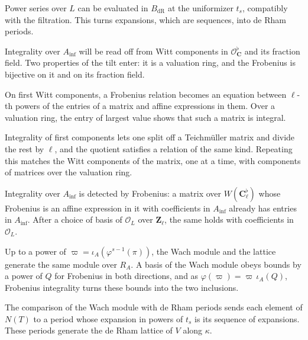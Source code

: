 Power series over $L$ can be evaluated in $B_{\mathrm{dR}}$ at the uniformizer
$t_s$, compatibly with the filtration. This turns expansions, which are
sequences, into de Rham periods.

Integrality over $A_{\mathrm{inf}}$ will be read off from Witt components in
$\mathcal O_{\mathbf C}^\flat$ and its fraction field. Two properties of the
tilt enter: it is a valuation ring, and the Frobenius is bijective on it and on
its fraction field.

On first Witt components, a Frobenius relation becomes an equation between
$\ell$-th powers of the entries of a matrix and affine expressions in them. Over
a valuation ring, the entry of largest value shows that such a matrix is
integral.

Integrality of first components lets one split off a Teichmüller matrix and
divide the rest by $\ell$, and the quotient satisfies a relation of the same
kind. Repeating this matches the Witt components of the matrix, one at a time,
with components of matrices over the valuation ring.

Integrality over $A_{\mathrm{inf}}$ is detected by Frobenius: a matrix over
$W(\mathbf C_\ell^\flat)$ whose Frobenius is an affine expression in it with
coefficients in $A_{\mathrm{inf}}$ already has entries in $A_{\mathrm{inf}}$.
After a choice of basis of $\mathcal O_L$ over $\mathbf Z_\ell$, the same holds
with coefficients in $\mathcal O_L$.

Up to a power of $\varpi=\iota_A(\varphi^{s-1}(\pi))$, the Wach module and the
lattice generate the same module over $R_A$. A basis of the Wach module obeys
bounds by a power of $Q$ for Frobenius in both directions, and as
$\varphi(\varpi)=\varpi\,\iota_A(Q)$, Frobenius integrality turns these bounds
into the two inclusions.

The comparison of the Wach module with de Rham periods sends each element of
$N(T)$ to a period whose expansion in powers of $t_s$ is its sequence of
expansions. These periods generate the de Rham lattice of $V$ along $\kappa$.

